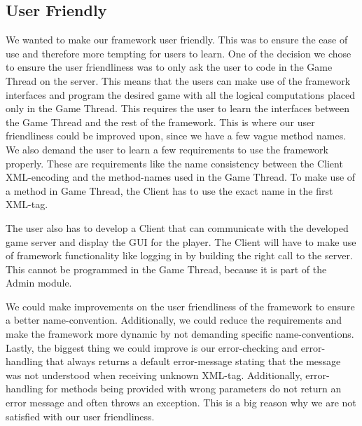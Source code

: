 \subsection{User Friendly}
We wanted to make our framework user friendly. This was to ensure the ease of use and therefore more tempting for users to learn. One of the decision we chose to ensure the user friendliness was to only ask the user to code in the Game Thread on the server. This means that the users can make use of the framework interfaces and program the desired game with all the logical computations placed only in the Game Thread. This requires the user to learn the interfaces between the Game Thread and the rest of the framework. This is where our user friendliness could be improved upon, since we have a few vague method names. We also demand the user to learn a few requirements to use the framework properly. These are requirements like the name consistency between the Client XML-encoding and the method-names used in the Game Thread. To make use of a method in Game Thread, the Client has to use the exact name in the first XML-tag. 

The user also has to develop a Client that can communicate with the developed game server and display the GUI for the player. The Client will have to make use of framework functionality like logging in by building the right call to the server. This cannot be programmed in the Game Thread, because it is part of the Admin module.  

We could make improvements on the user friendliness of the framework to ensure a better name-convention. Additionally, we could reduce the requirements and make the framework more dynamic by not demanding specific name-conventions. Lastly, the biggest thing we could improve is our error-checking and error-handling that always returns a default error-message stating that the message was not understood when receiving unknown XML-tag. Additionally, error-handling for methods being provided with wrong parameters do not return an error message and often throws an exception. This is a big reason why we are not satisfied with our user friendliness.
